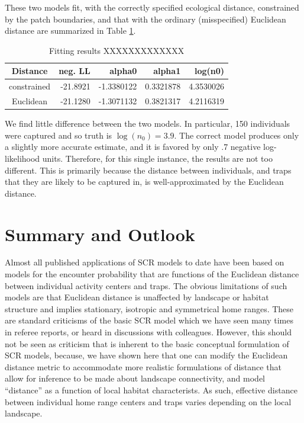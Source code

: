 These two models fit, with the correctly specified ecological
distance, constrained by the patch boundaries, and that with the
ordinary (misspecified) Euclidean distance are summarized in Table \ref{rsf.tab.fakecorridor}.
\begin{table}
\centering
\caption{Fitting results XXXXXXXXXXXXX}
\begin{tabular}{crrrr}
Distance    &  neg. LL &    alpha0   & alpha1    &log(n0) \\ \hline
constrained & -21.8921 &  -1.3380122 & 0.3321878 & 4.3530026 \\
Euclidean   & -21.1280 &  -1.3071132 & 0.3821317 & 4.2116319 \\
\end{tabular}
\label{rsf.tab.fakecorridor}
\end{table}
We find little difference between the two models. In
particular, 150 individuals were captured and so truth is $\log(n_{0}) = 3.9$.
The correct model produces only a slightly more accurate  estimate, and
it is favored by only .7 negative log-likelihood units.
Therefore, for this single instance, the results are not too different.
This is primarily because 
 the distance between individuals, and traps that they are likely
to be captured in, is well-approximated by the Euclidean distance.




\section{Summary and Outlook}


Almost 
all published applications of SCR models to date have been based on
models for the encounter probability that are functions of the
Euclidean distance between individual activity centers and traps. The
obvious limitations of such models are that Euclidean
distance is unaffected by landscape or habitat
structure and implies stationary, isotropic and symmetrical home
ranges. These are standard criticisms of the basic SCR model which we
have seen many times in referee reports, or heard in discussions with
colleagues.
However, this should not be seen as criticism 
that is inherent to the basic conceptual formulation of SCR models, because,
we have shown here that 
one can modify the Euclidean distance metric
to accommodate more realistic 
formulations of distance that allow for inference to be made about
landscape connectivity, and model ``distance'' as a function of
local habitat characterists. As such, effective distance between individual home
range centers and traps varies depending on the local landscape. 

